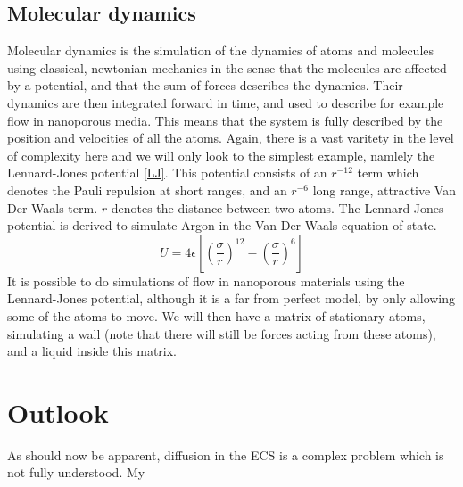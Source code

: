 \documentclass[a4paper,english, 12pt, twoside]{article}
\begin{document}
\subsection{Molecular dynamics}\label{MD}
Molecular dynamics is the simulation of the dynamics of atoms and molecules using classical, newtonian mechanics in the sense that the molecules are affected by a potential, and that the sum of forces describes the dynamics. 
Their dynamics are then integrated forward in time, and used to describe for example flow in nanoporous media. This means that the system is fully described by the position and velocities of all the atoms. 
Again, there is a vast varitety in the level of complexity here and we will only look to the simplest example, namlely the Lennard-Jones potential \ref{LJ}. 
This potential consists of an $r^{-12}$ term which denotes the Pauli repulsion at short ranges, and an $r^{-6}$ long range, attractive Van Der Waals term. $r$ denotes the distance between two atoms. 
The Lennard-Jones potential is derived to simulate Argon in the Van Der Waals equation of state.
\begin{equation}\label{LJ}
 U = 4\epsilon\left[\left(\frac{\sigma}{r}\right)^{12}-\left(\frac{\sigma}{r}\right)^{6}\right]
\end{equation}
It is possible to do simulations of flow in nanoporous materials using the Lennard-Jones potential, although it is a far from perfect model, by only allowing some of the atoms to move. 
We will then have a matrix of stationary atoms, simulating a wall (note that there will still be forces acting from these atoms), and a liquid inside this matrix.

\section{Outlook}
As should now be apparent, diffusion in the ECS is a complex problem which is not fully understood. 
My 
%   

\printbibliography
\end{document}
